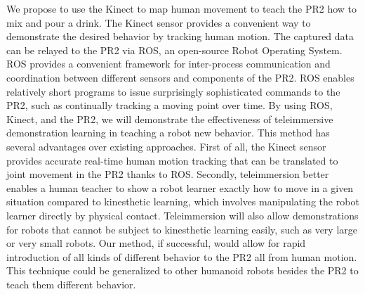 \documentclass{sig-alternate}
\begin{document}
We propose to use the Kinect to map human movement to teach the PR2 how to mix and pour a drink. The Kinect sensor provides a convenient way to demonstrate the desired behavior by tracking human motion. The captured data can be relayed to the PR2 via ROS, an open-source Robot Operating System\cite{ros}. ROS provides a convenient framework for inter-process communication and coordination between different sensors and components of the PR2. ROS enables relatively short programs to issue surprisingly sophisticated commands to the PR2, such as continually tracking a moving point over time\cite{ros_pr2}. By using ROS, Kinect, and the PR2, we will demonstrate the effectiveness of teleimmersive demonstration learning in teaching a robot new behavior. This method has several advantages over existing approaches. First of all, the Kinect sensor provides accurate real-time human motion tracking that can be translated to joint movement in the PR2 thanks to ROS. Secondly, teleimmersion better enables a human teacher to show a robot learner exactly how to move in a given situation compared to kinesthetic learning, which involves manipulating the robot learner directly by physical contact. Teleimmersion will also allow demonstrations for robots that cannot be subject to kinesthetic learning easily, such as very large or very small robots. Our method, if successful, would allow for rapid introduction of all kinds of different behavior to the PR2 all from human motion. This technique could be generalized to other humanoid robots besides the PR2 to teach them different behavior.
\end{document}
